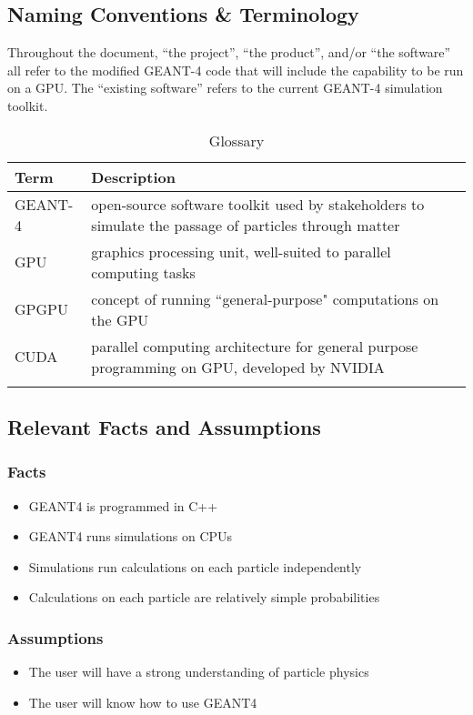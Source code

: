 \documentclass[12pt]{article}
\begin{document}
\subsection{Naming Conventions \& Terminology} %
Throughout the document, ``the project'', ``the product'', and/or ``the software'' all refer to the modified GEANT-4 code that will include the capability to be run on a GPU. The ``existing software'' refers to the current GEANT-4 simulation toolkit.\\

\begin{table}[h]
\centering
\caption{Glossary}
\begin{tabularx}{\textwidth}{l|X}
\Xhline{2\arrayrulewidth}
\bf Term & \bf Description\\
\hline
GEANT-4 & open-source software toolkit used by stakeholders to simulate the passage of particles through matter\\
GPU & graphics processing unit, well-suited to parallel computing tasks\\
GPGPU & concept of running ``general-purpose" computations on the GPU\\
CUDA & parallel computing architecture for general purpose programming on GPU, developed by NVIDIA\\
\Xhline{2\arrayrulewidth}
\end{tabularx}
\end{table}

\subsection{Relevant Facts and Assumptions} %
\subsubsection{Facts}
\begin{itemize}
\item GEANT4 is programmed in C++
\item GEANT4 runs simulations on CPUs
\item Simulations run calculations on each particle independently
\item Calculations on each particle are relatively simple probabilities
\end{itemize}

\subsubsection{Assumptions}
\begin{itemize}
\item The user will have a strong understanding of particle physics
\item The user will know how to use GEANT4
\end{itemize}
\end{document}
